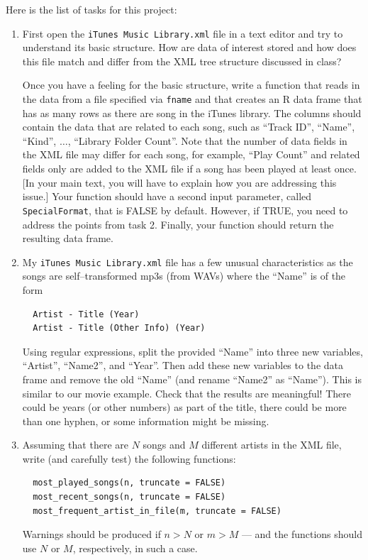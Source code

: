 \documentclass[11pt]{article}
\begin{document}
Here is the list of tasks for this project:
\begin{enumerate}
\item First open the {\tt iTunes Music Library.xml} file in a text editor and try to understand
its basic structure. How are data of interest stored and how does this file match
and differ from the XML tree structure discussed in class? 

Once you have a feeling for
the basic structure, write a function that 
reads in the data from a file specified via {\tt fname} and that creates an R data frame that has
as many rows as there are song in the iTunes library. The columns should contain
the data that are related to each song, such as ``Track ID'', ``Name'', ``Kind'', $\ldots$, 
``Library Folder Count''. Note that the number of data fields in the XML file may differ for each song,
for example, ``Play Count'' and related fields only are added to the XML file if a song has been
played at least once. [In your main text, you will have to explain how you are addressing
this issue.] Your function should have a second input parameter, called {\tt SpecialFormat},
that is FALSE by default. However, if TRUE, you need to address the points from task 2.
Finally, your function should return the resulting data frame.


\item My {\tt iTunes Music Library.xml} file has a few unusual characteristics
as the songs are self--transformed mp3s (from WAVs) where the ``Name'' is of the form
\begin{verbatim}
  Artist - Title (Year)
  Artist - Title (Other Info) (Year)
\end{verbatim}
Using regular expressions, split the provided ``Name'' into three new variables,
``Artist'', ``Name2'', and ``Year''. Then add these new variables to the data frame and
remove the old ``Name'' (and rename ``Name2'' as ``Name''). This is similar
to our movie example. Check that the results are meaningful! There could be
years (or other numbers) as part of the title, there could be more than
one hyphen, or some information might be missing. 


\item Assuming that there are $N$ songs and $M$ different artists in the XML file, write (and carefully test)
the following functions:
\begin{verbatim}
  most_played_songs(n, truncate = FALSE)
  most_recent_songs(n, truncate = FALSE)
  most_frequent_artist_in_file(m, truncate = FALSE)
\end{verbatim}
Warnings should be produced if $n > N$ or $m > M$  ---
and the functions should use $N$ or $M$, respectively, in such a case.


\end{enumerate}
\end{document}
